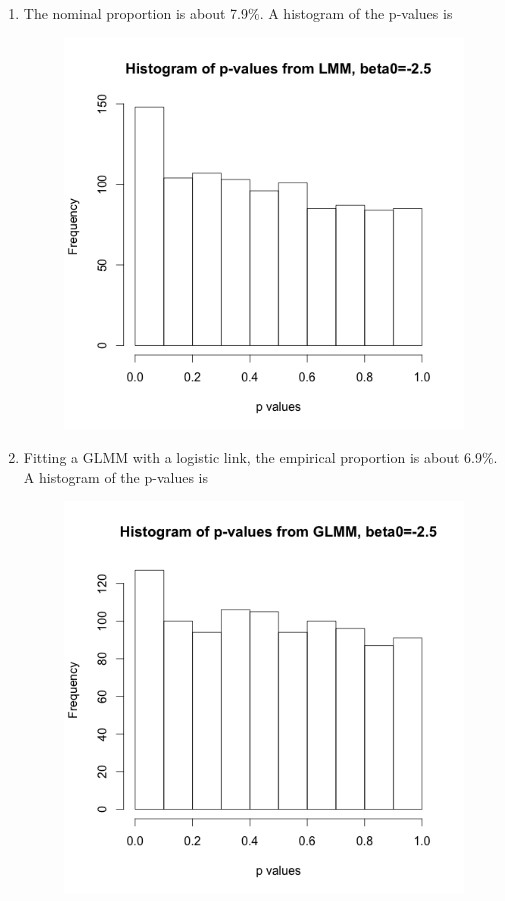 \documentclass[11pt]{article}
\begin{document}
\begin{enumerate}
	\begin{enumerate}
		\item The nominal proportion is about 7.9\%. A histogram of the p-values is
		\begin{figure}[H]
		\centering
			\includegraphics[scale=0.4]{Rplotp5a}
		\end{figure}
		
		\item Fitting a GLMM with a logistic link, the empirical proportion is about 6.9\%. A histogram of the p-values is
		\begin{figure}[H]
		\centering
			\includegraphics[scale=0.4]{Rplotp5b}
		\end{figure}
		

\end{enumerate}
\end{enumerate}
\end{document}
